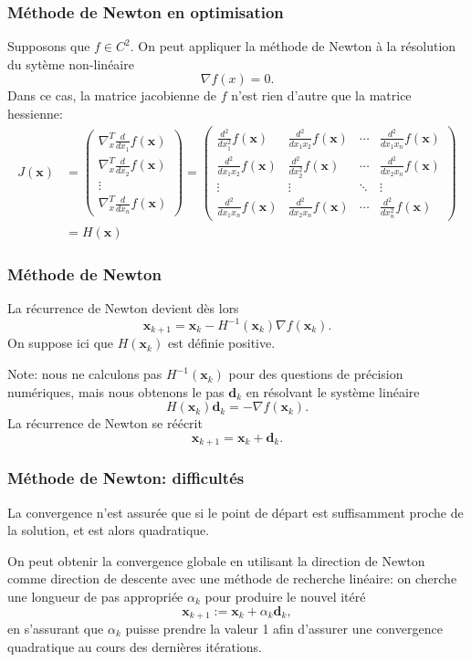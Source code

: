 \documentclass[usepdftitle=false, aspectratio=169]{beamer}
\def\bd{\boldsymbol{d}}
\def\bx{\boldsymbol{x}}
\begin{document}
\begin{frame}
	\frametitle{Méthode de Newton en optimisation}

Supposons que $f \in C^2$.
On peut appliquer la méthode de Newton à la résolution du sytème non-linéaire
$$
\nabla f(x) = 0.
$$
Dans ce cas, la matrice jacobienne de $f$ n'est rien d'autre que la matrice hessienne:
\begin{align*}
J(\bx) &=
\begin{pmatrix}
	\nabla^T_x \frac{d}{dx_1} f(\bx) \\
	\nabla^T_x \frac{d}{dx_2} f(\bx) \\
	\vdots \\
	\nabla^T_x \frac{d}{dx_n} f(\bx)
\end{pmatrix}
=
\begin{pmatrix}
	\frac{d^2}{dx_1^2} f(\bx) & \frac{d^2}{dx_1x_2} f(\bx) & \cdots & \frac{d^2}{dx_1x_n} f(\bx) \\
	\frac{d^2}{dx_1x_2} f(\bx) & \frac{d^2}{dx_2^2} f(\bx) & \cdots & \frac{d^2}{dx_2x_n} f(\bx) \\
	\vdots & \vdots & \ddots & \vdots \\
	\frac{d^2}{dx_1x_n} f(\bx) & \frac{d^2}{dx_2x_n} f(\bx) & \cdots & \frac{d^2}{dx_n^2} f(\bx)
\end{pmatrix} \\
&= H(\bx)
\end{align*}
	
\end{frame}

\begin{frame}
\frametitle{Méthode de Newton}

La récurrence de Newton devient dès lors
$$
\bx_{k+1} = \bx_k - H^{-1}(\bx_k) \nabla f(\bx_k).
$$
On suppose ici que $H(\bx_k)$ est définie positive.

\mbox{}

Note: nous ne calculons pas $H^{-1}(\bx_k)$ pour des questions de précision numériques, mais nous obtenons le pas $\bd_k$ en résolvant le système linéaire
$$
H(\bx_k) \bd_k = -\nabla f(\bx_k).
$$
La récurrence de Newton se réécrit
$$
\bx_{k+1} = \bx_k + \bd_k.
$$

\end{frame}

\begin{frame}
\frametitle{Méthode de Newton: difficultés}

La convergence n'est assurée que si le point de départ est suffisamment proche de la solution, et est alors quadratique.

\mbox{}

On peut obtenir la convergence globale en utilisant la direction de Newton comme direction de descente avec une méthode de recherche linéaire: on cherche une longueur de pas appropriée $\alpha_k$ pour produire le nouvel itéré
$$
\bx_{k+1} := \bx_k+\alpha_k \bd_k, 
$$
en s'assurant que $\alpha_k$ puisse prendre la valeur 1 afin d'assurer une convergence quadratique au cours des dernières itérations.

\end{frame}
\end{document}
